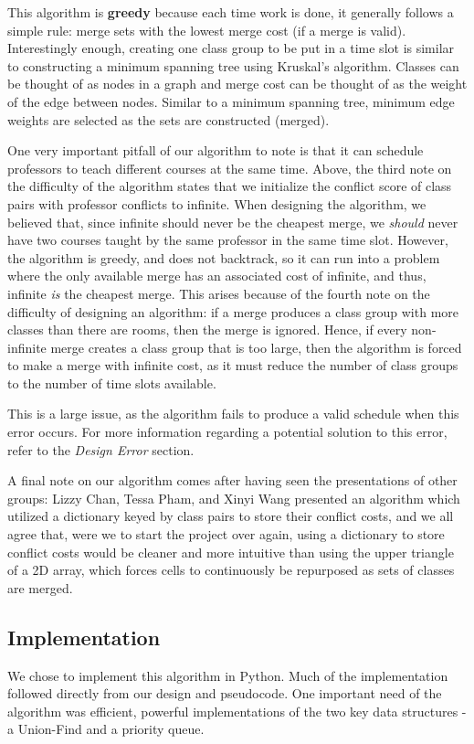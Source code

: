\documentclass[11pt, oneside]{article}   	%
\begin{document}
This algorithm is {\bf greedy} because each time work is done, it generally follows a simple rule: merge sets with the lowest merge cost (if a merge is valid). Interestingly enough, creating one class group to be put in a time slot is similar to constructing a minimum spanning tree using Kruskal's algorithm. Classes can be thought of as nodes in a graph and merge cost can be thought of as the weight of the edge between nodes. Similar to a minimum spanning tree, minimum edge weights are selected as the sets are constructed (merged).

One very important pitfall of our algorithm to note is that it can schedule professors to teach different courses at the same time. Above, the third note on the difficulty of the algorithm states that we initialize the conflict score of class pairs with professor conflicts to infinite. When designing the algorithm, we believed that, since infinite should never be the cheapest merge, we \textit{should} never have two courses taught by the same professor in the same time slot. However, the algorithm is greedy, and does not backtrack, so it can run into a problem where the only available merge has an associated cost of infinite, and thus, infinite \textit{is} the cheapest merge. This arises because of the fourth note on the difficulty of designing an algorithm: if a merge produces a class group with more classes than there are rooms, then the merge is ignored. Hence, if every non-infinite merge creates a class group that is too large, then the algorithm is forced to make a merge with infinite cost, as it must reduce the number of class groups to the number of time slots available.

This is a large issue, as the algorithm fails to produce a valid schedule when this error occurs. For more information regarding a potential solution to this error, refer to the \textit{Design Error} section.

A final note on our algorithm comes after having seen the presentations of other groups: Lizzy Chan, Tessa Pham, and Xinyi Wang presented an algorithm which utilized a dictionary keyed by class pairs to store their conflict costs, and we all agree that, were we to start the project over again, using a dictionary to store conflict costs would be cleaner and more intuitive than using the upper triangle of a 2D array, which forces cells to continuously be repurposed as sets of classes are merged.

\subsection{Implementation}
We chose to implement this algorithm in Python. Much of the implementation followed directly from our design and pseudocode. One important need of the algorithm was efficient, powerful implementations of the two key data structures - a Union-Find and a priority queue.
\end{document}
